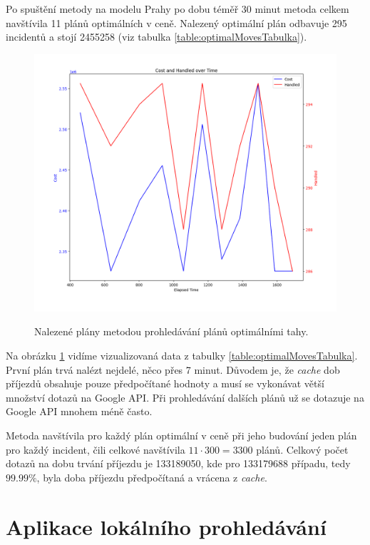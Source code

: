 Po spuštění metody na modelu Prahy po dobu téměř 30 minut metoda celkem navštívila 11 plánů optimálních v ceně.
Nalezený optimální plán odbavuje 295 incidentů a stojí 2455258 (viz tabulka \ref{table:optimalMovesTabulka}).

\begin{figure}[H]
  \caption{Nalezené plány metodou prohledávání plánů optimálními tahy.}
  \includegraphics[width=\textwidth]{img/optimalMovesRes.png}
  \centering
  \label{img:optimalMovesRes}
\end{figure}

Na obrázku \ref{img:optimalMovesRes} vidíme vizualizovaná data z tabulky \ref{table:optimalMovesTabulka}. 
První plán trvá nalézt nejdelé, něco přes 7 minut. Důvodem je, že \textit{cache} dob příjezdů obsahuje pouze předpočítané hodnoty a musí se vykonávat větší množství
dotazů na Google API.
Při prohledávání dalších plánů už se dotazuje na Google API mnohem méně často.

Metoda navštívila pro každý plán optimální v ceně při jeho budování jeden plán pro každý incident, čili celkové navštívila $11 \cdot 300 = 3300$ plánů.
Celkový počet dotazů na dobu trvání příjezdu je 133189050, kde pro 133179688 případu, tedy $99.99\%$, byla doba příjezdu předpočítaná a vrácena z \textit{cache}.

\section{Aplikace lokálního prohledávání}

